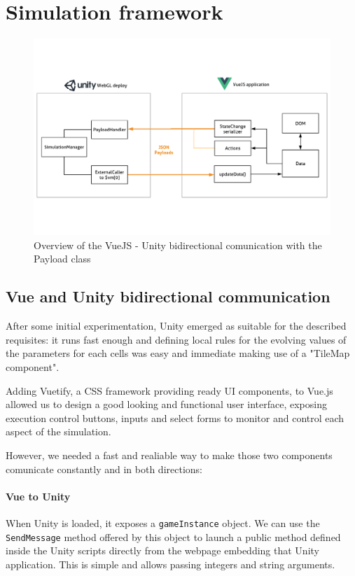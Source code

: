 \section{Simulation framework}
\begin{figure}
  \centering
    \includegraphics[width=1\textwidth]{sw_arch}%
    
  \caption{Overview of the VueJS - Unity bidirectional comunication with the Payload class}
  \label{fig:swstack1}
\end{figure}
\subsection{Vue and Unity bidirectional communication}
After some initial experimentation, Unity emerged as suitable for the described requisites: it runs fast enough and defining local rules for the evolving values of the parameters for each cells was easy and immediate making use of a "TileMap component".

Adding Vuetify, a CSS framework providing ready UI components, to Vue.js allowed us to design a good looking and functional user interface, exposing execution control buttons, inputs and select forms to monitor and control each aspect of the simulation.

However, we needed a fast and realiable way to make those two components comunicate constantly and in both directions:

\paragraph{Vue to Unity}

When Unity is loaded, it exposes a \texttt{gameInstance} object. We can use the \texttt{SendMessage} method offered by this object to launch a public method defined inside the Unity scripts directly from the webpage embedding that Unity application. This is simple and allows passing integers and string arguments.


